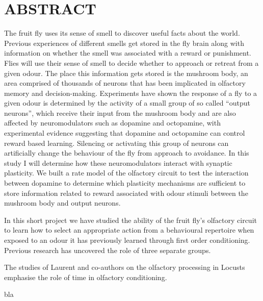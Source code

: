 \section{ABSTRACT}


The fruit fly uses its sense of smell to discover useful facts about the world. \iffalse Strange odours are populating the world everywhere, every being tries to smell it as the molecules propagate without end \fi  Previous experiences of different smells get stored in
the fly brain along with information on whether the smell was associated
with a reward or punishment. \iffalse Reward or punishment, as if this is the be all end all of everything. It's not we don't think in binary, things don't exist in only two states above the scale of quanta. \fi Flies will use their sense of smell to
decide whether to approach or retreat from a given odour. The place
this information gets stored is the mushroom body, an area comprised
of thousands of neurons that has been implicated in olfactory memory
and decision-making. Experiments have shown the response of a fly
to a given odour is determined by the activity of a small group of
so called \textquotedblleft output neurons\textquotedblright , which
receive their input from the mushroom body and are also affected by
neuromodulators such as dopamine and octopamine, with experimental
evidence suggesting that dopamine and octopamine can control reward
based learning. Silencing or activating this group of neurons can
artificially change the behaviour of the fly from approach to avoidance.
In this study I will determine how these neuromodulators interact
with synaptic plasticity. We built a rate model of the olfactory circuit to test the interaction between dopamine to determine which plasticity mechanisms are sufficient to store information related to reward associated with odour stimuli between the mushroom body and output neurons.

In this short project we have studied the ability of the fruit fly's olfactory circuit to learn how to select an appropriate action from a behavioural repertoire when exposed to an odour it has previously learned through first order conditioning. Previous research has uncovered the role of three separate groups. 

The studies of Laurent and co-authors on the olfactory processing in Locusts \cite{25864636}   emphasise the role of time in olfactory conditioning. 
  
  
  
  
  
  
  
  
bla \cite{25864636}  
  
  